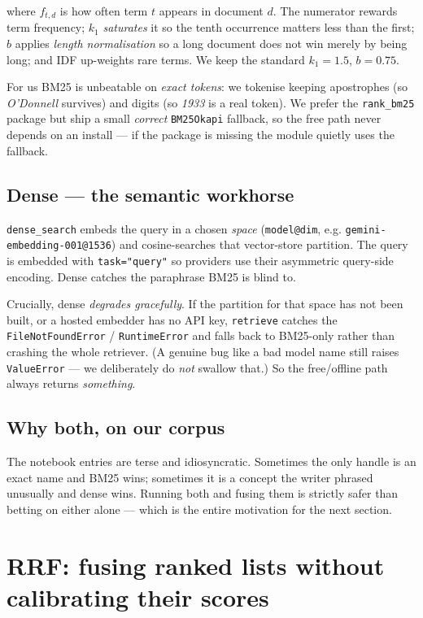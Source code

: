 \documentclass[11pt]{article}
\newcommand{\code}[1]{\texttt{#1}}
\begin{document}
where $f_{t,d}$ is how often term $t$ appears in document $d$. The numerator rewards term frequency;
$k_1$ \emph{saturates} it so the tenth occurrence matters less than the first; $b$ applies
\emph{length normalisation} so a long document does not win merely by being long; and IDF up-weights
rare terms. We keep the standard $k_1{=}1.5$, $b{=}0.75$.

For us BM25 is unbeatable on \emph{exact tokens}: we tokenise keeping apostrophes (so
\emph{O'Donnell} survives) and digits (so \emph{1933} is a real token). We prefer the
\code{rank\_bm25} package but ship a small \emph{correct} \code{BM25Okapi} fallback, so the free path
never depends on an install --- if the package is missing the module quietly uses the fallback.

\subsection{Dense --- the semantic workhorse}

\code{dense\_search} embeds the query in a chosen \emph{space} (\code{model@dim}, e.g.
\code{gemini-embedding-001@1536}) and cosine-searches that vector-store partition. The query is
embedded with \code{task="query"} so providers use their asymmetric query-side encoding. Dense
catches the paraphrase BM25 is blind to.

Crucially, dense \emph{degrades gracefully}. If the partition for that space has not been built, or a
hosted embedder has no API key, \code{retrieve} catches the \code{FileNotFoundError} /
\code{RuntimeError} and falls back to BM25-only rather than crashing the whole retriever. (A genuine
bug like a bad model name still raises \code{ValueError} --- we deliberately do \emph{not} swallow
that.) So the free/offline path always returns \emph{something}.

\subsection{Why both, on our corpus}

The notebook entries are terse and idiosyncratic. Sometimes the only handle is an exact name and
BM25 wins; sometimes it is a concept the writer phrased unusually and dense wins. Running both and
fusing them is strictly safer than betting on either alone --- which is the entire motivation for the
next section.

\section{RRF: fusing ranked lists without calibrating their scores}
\end{document}
